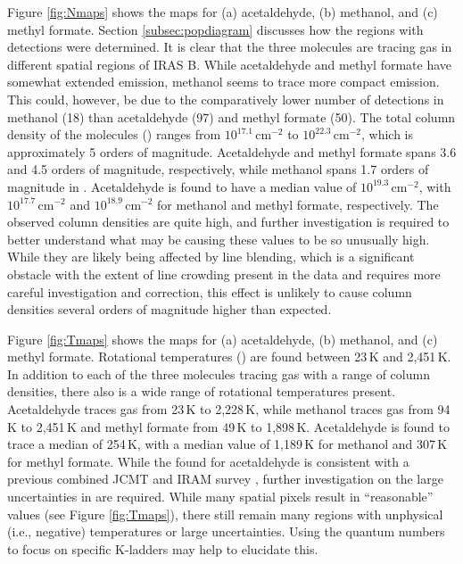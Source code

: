 \documentclass[iop,twocolappendix]{emulateapj}
\begin{document}
Figure \ref{fig:Nmaps} shows the {\Ntot} maps for (a) acetaldehyde, (b) methanol, and (c) methyl formate. Section \ref{subsec:popdiagram} discusses how the regions with detections were determined. It is clear that the three molecules are tracing gas in different spatial regions of IRAS B. While acetaldehyde and methyl formate have somewhat extended emission, methanol seems to trace more compact emission. This could, however, be due to the comparatively lower number of detections in methanol (18) than acetaldehyde (97) and methyl formate (50). The total column density of the molecules (\Ntot) ranges from $10^{17.1}$\,cm$^{-2}$ to $10^{22.3}$\,cm$^{-2}$, which is approximately 5 orders of magnitude. Acetaldehyde and methyl formate spans 3.6 and 4.5 orders of magnitude, respectively, while methanol spans 1.7 orders of magnitude in \Ntot. Acetaldehyde is found to have a median {\Ntot} value of $10^{19.3}$\,cm$^{-2}$, with $10^{17.7}$\,cm$^{-2}$ and $10^{18.9}$\,cm$^{-2}$ for methanol and methyl formate, respectively. The observed column densities are quite high, and further investigation is required to better understand what may be causing these values to be so unusually high. While they are likely being affected by line blending, which is a significant obstacle with the extent of line crowding present in the data and requires more careful investigation and correction, this effect is unlikely to cause column densities several orders of magnitude higher than expected.

Figure \ref{fig:Tmaps} shows the {\Trot} maps for (a) acetaldehyde, (b) methanol, and (c) methyl formate. Rotational temperatures (\Trot) are found between 23\,K and 2,451\,K. In addition to each of the three molecules tracing gas with a range of column densities, there also is a wide range of rotational temperatures present. Acetaldehyde traces gas from 23\,K to 2,228\,K, while methanol traces gas from 94\,K to 2,451\,K and methyl formate from 49\,K to 1,898\,K. Acetaldehyde is found to trace a median {\Trot} of 254\,K, with a median value of 1,189\,K for methanol and 307\,K for methyl formate. While the {\Trot} found for acetaldehyde is consistent with a previous combined JCMT and IRAM survey \citep{Caux2011}, further investigation on the large uncertainties in {\Trot} are required. While many spatial pixels result in ``reasonable'' {\Trot} values (see Figure \ref{fig:Tmaps}), there still remain many regions with unphysical (i.e., negative) temperatures or large uncertainties. Using the quantum numbers to focus on specific K-ladders may help to elucidate this.
\end{document}
